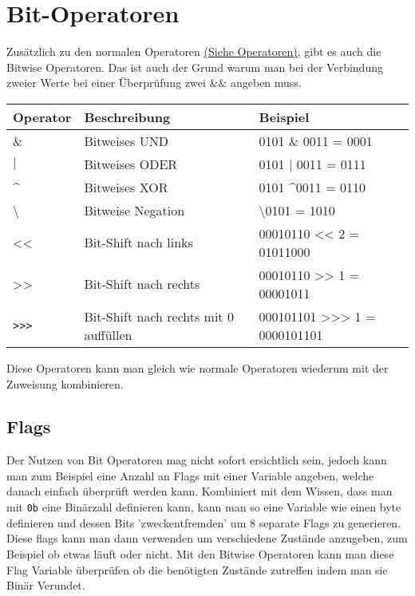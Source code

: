 \documentclass{article}
\begin{document}
	  \section{Bit-Operatoren}
	  Zusätzlich zu den normalen Operatoren \hyperref[sec:Operatoren]{\underline{(Siehe Operatoren)}}, gibt es auch die Bitwise Operatoren. Das ist auch der Grund warum man bei der Verbindung zweier Werte bei einer Überprüfung zwei \&\& angeben muss.
	  \begin{center}
		  \begin{tabular}{| l | l | l |}
		  	\toprule
		  	Operator & Beschreibung & Beispiel \\ \midrule
		  	\& & Bitweises UND & 0101 \& 0011 = 0001 \\ \hline
		  	$\vert$ & Bitweises ODER & 0101 $\vert$ 0011 = 0111 \\ \hline
		  	\textasciicircum & Bitweises XOR & 0101 \textasciicircum 0011 = 0110 \\ \hline
		  	\textbackslash & Bitweise Negation & \textbackslash 0101 = 1010 \\ \hline
		  	<< & Bit-Shift nach links & 00010110 << 2 = 01011000 \\ \hline
		  	>> & Bit-Shift nach rechts & 00010110 >> 1 = 00001011 \\ \hline
		  	\verb|>>>| & Bit-Shift nach rechts mit 0 auffüllen & 000101101 >>> 1 = 0000101101 \\
	 	  	\bottomrule
		  \end{tabular}
	  \end{center}
	  Diese Operatoren kann man gleich wie normale Operatoren wiederum mit der Zuweisung kombinieren.
	  \subsection{Flags}
	  Der Nutzen von Bit Operatoren mag nicht sofort ersichtlich sein, jedoch kann man zum Beispiel eine Anzahl an Flags mit einer Variable angeben, welche danach einfach überprüft werden kann. Kombiniert mit dem Wissen, dass man mit \verb|0b| eine Binärzahl definieren kann, kann man so eine Variable wie einen byte definieren und dessen Bits 'zweckentfremden' um 8 separate Flags zu generieren. Diese flags kann man dann verwenden um verschiedene Zustände anzugeben, zum Beispiel ob etwas läuft oder nicht. Mit den Bitwise Operatoren kann man diese Flag Variable überprüfen ob die benötigten Zustände zutreffen indem man sie Binär Verundet.
\end{document}
